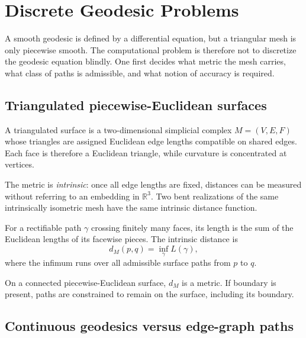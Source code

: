 \chapter{Discrete Geodesic Problems}
\label{ch:vii38}

A smooth geodesic is defined by a differential equation, but a triangular mesh is
only piecewise smooth.  The computational problem is therefore not to discretize
the geodesic equation blindly.  One first decides what metric the mesh carries,
what class of paths is admissible, and what notion of accuracy is required.

\section{Triangulated piecewise-Euclidean surfaces}

\begin{definition}\label{def:vii38-tri}
A triangulated surface is a two-dimensional simplicial complex \(M=(V,E,F)\)
whose triangles are assigned Euclidean edge lengths compatible on shared edges.
Each face is therefore a Euclidean triangle, while curvature is concentrated at
vertices.
\end{definition}

The metric is \emph{intrinsic}: once all edge lengths are fixed, distances can be
measured without referring to an embedding in \(\mathbb R^3\).  Two bent
realizations of the same intrinsically isometric mesh have the same intrinsic
distance function.

\begin{definition}\label{def:vii38-length}
For a rectifiable path \(\gamma\) crossing finitely many faces, its length is the
sum of the Euclidean lengths of its facewise pieces.  The intrinsic distance is
\[
d_M(p,q)=\inf_\gamma L(\gamma),
\]
where the infimum runs over all admissible surface paths from \(p\) to \(q\).
\end{definition}

\begin{proposition}\label{prop:vii38-metric}
On a connected piecewise-Euclidean surface, \(d_M\) is a metric.  If boundary is
present, paths are constrained to remain on the surface, including its boundary.
\end{proposition}

\section{Continuous geodesics versus edge-graph paths}

